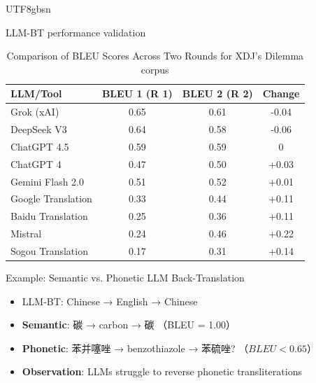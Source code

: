 \documentclass{beamer}
\begin{document}
\begin{CJK*}{UTF8}{gbsn}
\begin{frame}{LLM-BT performance validation}
\begin{table}[h]
\centering
\caption{Comparison of BLEU Scores Across Two Rounds for XDJ’s Dilemma corpus} %
\label{tab:bleu_comparison}
\begin{tabular}{lccc}
\toprule
\textbf{LLM/Tool}         & \textbf{BLEU 1 (R 1)} & \textbf{BLEU 2 (R 2)} & \textbf{Change} \\
\midrule
Grok (xAI)               & 0.65                     & 0.61                     & -0.04          \\
DeepSeek V3              & 0.64                     & 0.58                     & -0.06          \\
ChatGPT 4.5              & 0.59                     & 0.59                        & 0              \\
ChatGPT 4                & 0.47                     & 0.50                     & +0.03          \\
Gemini Flash 2.0         & 0.51                        & 0.52                     & +0.01              \\
Google Translation       & 0.33                     & 0.44                     & +0.11          \\
Baidu Translation        & 0.25                     & 0.36                     & +0.11          \\
Mistral                  & 0.24                     & 0.46                     & +0.22          \\
Sogou Translation        & 0.17                     & 0.31                     & +0.14          \\
\bottomrule
\end{tabular}
\end{table}
\end{frame}



\begin{frame}{Example: Semantic vs. Phonetic LLM Back-Translation}
\begin{itemize}
    \item LLM-BT: Chinese → English → Chinese
    \item \textbf{Semantic}: 碳 → carbon → 碳 （BLEU = 1.00）
    \item \textbf{Phonetic}: 苯并噻唑 → benzothiazole → 苯硫唑? （$BLEU < 0.65$）
    \item \textbf{Observation}: LLMs struggle to reverse phonetic transliterations
\end{itemize}
\end{frame}


\end{CJK*}
\end{document}
